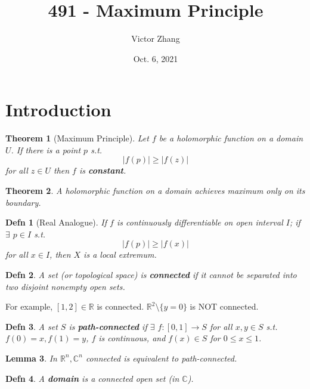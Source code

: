 \documentclass{article}
\title{491 - Maximum Principle}
\author{Victor Zhang}
\date{Oct. 6, 2021}
\newtheorem{theorem}{Theorem}
\newtheorem{definition}{Defn}
\newtheorem{lemma}[theorem]{Lemma}
\begin{document}
\maketitle

\section{Introduction}
\begin{theorem}[Maximum Principle]
Let $f$ be a holomorphic function on a domain $U$. If there is a point $p$ s.t.
$$|f(p)| \geq |f(z)|$$
for all $z \in U$ then $f$ is \textbf{constant}.
\end{theorem}

\begin{theorem}
A holomorphic function on a domain achieves maximum only on its boundary.
\end{theorem}

\begin{definition}[Real Analogue]
If $f$ is continuously differentiable on open interval $I$; if $\exists$ $p \in I$ s.t.
$$|f(p)| \geq |f(x)|$$
for all $x \in I$, then $X$ is a local extremum.
\end{definition}

\begin{definition}
A set (or topological space) is \textbf{connected} if it cannot be separated into two disjoint nonempty open sets.
\end{definition}

For example, $[1,2] \in \mathbb{R}$ is connected. $\mathbb{R}^2 \setminus \{y = 0\}$ is NOT connected.

\begin{definition}
A set $S$ is \textbf{path-connected} if $\exists$ $f : [0,1] \to S$ for all $x,y \in S$ s.t. $f(0) = x, f(1) = y$, $f$ is continuous, and $f(x) \in S$ for $0 \leq x \leq 1$.
\end{definition}

\begin{lemma}
In $\mathbb{R}^n, \mathbb{C}^n$ connected is equivalent to path-connected.
\end{lemma}

\begin{definition}
A \textbf{domain} is a connected open set (in $\mathbb{C}$).
\end{definition}
\end{document}
